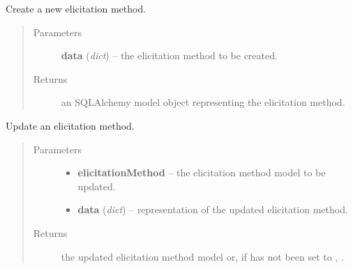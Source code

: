 \documentclass[letterpaper,10pt,english]{sphinxmanual}
\begin{document}
\begin{fulllineitems}
\label{api:onlinelinguisticdatabase.controllers.elicitationmethods.createNewElicitationMethod}
Create a new elicitation method.
\begin{quote}\begin{description}
\item[{Parameters}] \leavevmode
\textbf{data} (\emph{dict}) -- the elicitation method to be created.

\item[{Returns}] \leavevmode
an SQLAlchemy model object representing the elicitation method.

\end{description}\end{quote}

\end{fulllineitems}


\begin{fulllineitems}
\label{api:onlinelinguisticdatabase.controllers.elicitationmethods.updateElicitationMethod}
Update an elicitation method.
\begin{quote}\begin{description}
\item[{Parameters}] \leavevmode\begin{itemize}
\item {} 
\textbf{elicitationMethod} -- the elicitation method model to be updated.

\item {} 
\textbf{data} (\emph{dict}) -- representation of the updated elicitation method.

\end{itemize}

\item[{Returns}] \leavevmode
the updated elicitation method model or, if  has not
been set to , .

\end{description}\end{quote}

\end{fulllineitems}
\end{document}
